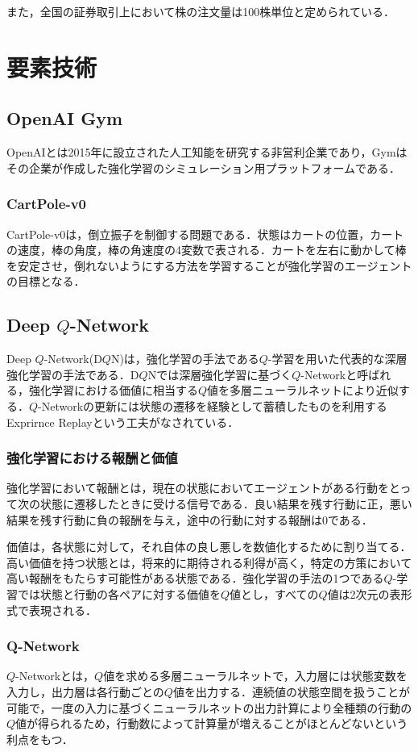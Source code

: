 \documentclass[twocolumn]{jarticle}
\begin{document}
    また，全国の証券取引上において株の注文量は100株単位と定められている．

\section{要素技術}

    \subsection{OpenAI Gym}
    OpenAIとは2015年に設立された人工知能を研究する非営利企業であり，Gymはその企業が作成した強化学習のシミュレーション用プラットフォームである．

        \subsubsection{CartPole-v0}
        CartPole-v0は，倒立振子を制御する問題である．状態はカートの位置，カートの速度，棒の角度，棒の角速度の4変数で表される．カートを左右に動かして棒を安定させ，倒れないようにする方法を学習することが強化学習のエージェントの目標となる．

    \subsection{Deep $Q$-Network}
    Deep $Q$-Network(D$Q$N)は，強化学習の手法である$Q$-学習を用いた代表的な深層強化学習の手法である．D$Q$Nでは深層強化学習に基づく$Q$-Networkと呼ばれる，強化学習における価値に相当する$Q$値を多層ニューラルネットにより近似する．$Q$-Networkの更新には状態の遷移を経験として蓄積したものを利用するExprirnce Replayという工夫がなされている．

        \subsubsection{強化学習における報酬と価値}
        強化学習において報酬とは，現在の状態においてエージェントがある行動をとって次の状態に遷移したときに受ける信号である．良い結果を残す行動に正，悪い結果を残す行動に負の報酬を与え，途中の行動に対する報酬は0である．

        価値は，各状態に対して，それ自体の良し悪しを数値化するために割り当てる．高い価値を持つ状態とは，将来的に期待される利得が高く，特定の方策において高い報酬をもたらす可能性がある状態である．強化学習の手法の1つである$Q$-学習では状態と行動の各ペアに対する価値を$Q$値とし，すべての$Q$値は2次元の表形式で表現される．

        \subsubsection{Q-Network}
        $Q$-Networkとは，$Q$値を求める多層ニューラルネットで，入力層には状態変数を入力し，出力層は各行動ごとの$Q$値を出力する．連続値の状態空間を扱うことが可能で，一度の入力に基づくニューラルネットの出力計算により全種類の行動の$Q$値が得られるため，行動数によって計算量が増えることがほとんどないという利点をもつ．
\end{document}

